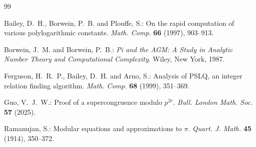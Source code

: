 \documentclass[12pt, a4paper]{article}
\theoremstyle{plain}
\theoremstyle{definition}
\theoremstyle{remark}
\numberwithin{equation}{section}
\begin{document}
\begin{thebibliography}{99}

Bailey, D.~H., Borwein, P.~B. and Plouffe, S.: On the rapid computation of various polylogarithmic constants.
\emph{Math. Comp.} \textbf{66} (1997), 903--913.

Borwein, J.~M. and Borwein, P.~B.: \emph{Pi and the AGM: A Study in Analytic Number Theory and Computational Complexity}.
Wiley, New York, 1987.

Ferguson, H.~R.~P., Bailey, D.~H. and Arno, S.: Analysis of PSLQ, an integer relation finding algorithm.
\emph{Math. Comp.} \textbf{68} (1999), 351--369.

Guo, V.~J.~W.: Proof of a supercongruence modulo $p^{2r}$.
\emph{Bull. London Math. Soc.} \textbf{57} (2025).

Ramanujan, S.: Modular equations and approximations to $\pi$.
\emph{Quart. J. Math.} \textbf{45} (1914), 350--372.

\end{thebibliography}
\end{document}
